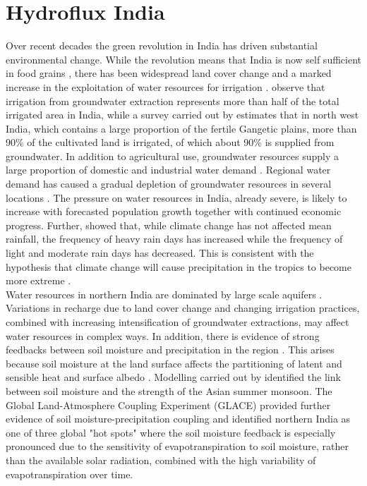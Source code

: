 \documentclass{icldt}\usepackage[]{graphicx}\usepackage[]{color}
\begin{document}
\section{Hydroflux India}
Over recent decades the green revolution in India has driven substantial environmental change. While the revolution means that India is now self sufficient in food grains \citep{Singh2000}, there has been widespread land cover change and a marked increase in the exploitation of water resources for irrigation \citep{Roy2007}. \citet{Scott2009} observe that irrigation from groundwater extraction represents more than half of the total irrigated area in India, while a survey carried out by \citet{Shah2006} estimates that in north west India, which contains a large proportion of the fertile Gangetic plains, more than 90\% of the cultivated land is irrigated, of which about 90\% is supplied from groundwater. In addition to agricultural use, groundwater resources supply a large proportion of domestic and industrial water demand \citep{Amarasinghe2005}. Regional water demand has caused a gradual depletion of groundwater resources in several locations \citep{Rodell2009}. The pressure on water resources in India, already severe, is likely to increase with forecasted population growth together with continued economic progress. Further, \citet{Goswami2006} showed that, while climate change has not affected mean rainfall, the frequency of heavy rain days has increased while the frequency of light and moderate rain days has decreased. This is consistent with the hypothesis that climate change will cause precipitation in the tropics to become more extreme \citep{Trenberth2003}. \\

Water resources in northern India are dominated by large scale aquifers \citep{Bandy1995}. Variations in recharge due to land cover change and changing irrigation practices, combined with increasing intensification of groundwater extractions, may affect water resources in complex ways. In addition, there is evidence of strong feedbacks between soil moisture and precipitation in the region \citep[e.g.][]{Meehl1994,Koster2004,Niyogi2010}. This arises because soil moisture at the land surface affects the partitioning of latent and sensible heat and surface albedo \citet{Eltahir1998}. Modelling carried out by \citet{Meehl1994} identified the link between soil moisture and the strength of the Asian summer monsoon. The Global Land-Atmosphere Coupling Experiment (GLACE) \citep{Koster2004,Koster2006,Guo2006} provided further evidence of soil moisture-precipitation coupling and identified northern India as one of three global "hot spots" where the soil moisture feedback is especially pronounced due to the sensitivity of evapotranspiration to soil moisture, rather than the available solar radiation, combined with the high variability of evapotranspiration over time. \\
\end{document}
